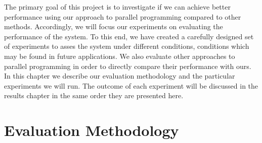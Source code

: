 






The primary goal of this project is to investigate if we can achieve better performance using our approach to parallel programming compared to other methods. Accordingly, we will focus our experiments on evaluating the performance of the system. To this end, we have created a carefully designed set of experiments to asses the system under different conditions, conditions which may be found in future applications. We also evaluate other approaches to parallel programming in order to directly compare their performance with ours. In this chapter we describe our evaluation methodology and the particular experiments we will run. The outcome of each experiment will be discussed in the results chapter in the same order they are presented here.



\section{Evaluation Methodology}

